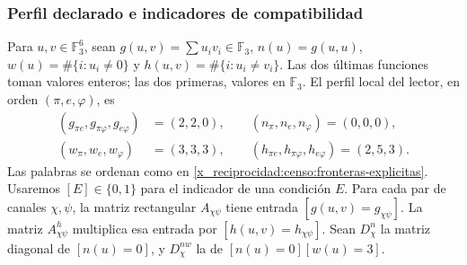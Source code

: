 \subsubsection{Perfil declarado e indicadores de compatibilidad}

Para \(u,v\in\mathbb F_3^6\), sean
\(g(u,v)=\sum u_iv_i\in\mathbb F_3\),
\(n(u)=g(u,u)\), \(w(u)=\#\{i:u_i\ne0\}\) y
\(h(u,v)=\#\{i:u_i\ne v_i\}\). Las dos últimas funciones toman
valores enteros; las dos primeras, valores en \(\mathbb F_3\).
El perfil local del lector, en orden \((\pi,e,\varphi)\), es
\begin{equation}
 \begin{split}
 (g_{\pi e},g_{\pi\varphi},g_{e\varphi})&=(2,2,0),\qquad
 (n_\pi,n_e,n_\varphi)=(0,0,0),\\
 (w_\pi,w_e,w_\varphi)&=(3,3,3),\qquad
 (h_{\pi e},h_{\pi\varphi},h_{e\varphi})=(2,5,3).
 \end{split}
 \label{x_reciprocidad:censo:perfil-local}
\end{equation}
Las palabras se ordenan como en \eqref{x_reciprocidad:censo:fronteras-explicitas}.
Usaremos \([E]\in\{0,1\}\) para el indicador de una condición \(E\).
Para cada par de canales \(\chi,\psi\), la matriz rectangular
\(A_{\chi\psi}\) tiene entrada \([g(u,v)=g_{\chi\psi}]\).
La matriz \(A^{h}_{\chi\psi}\) multiplica esa entrada por
\([h(u,v)=h_{\chi\psi}]\). Sean \(D_\chi^n\) la matriz diagonal
de \([n(u)=0]\), y \(D_\chi^{nw}\) la de
\([n(u)=0][w(u)=3]\).

